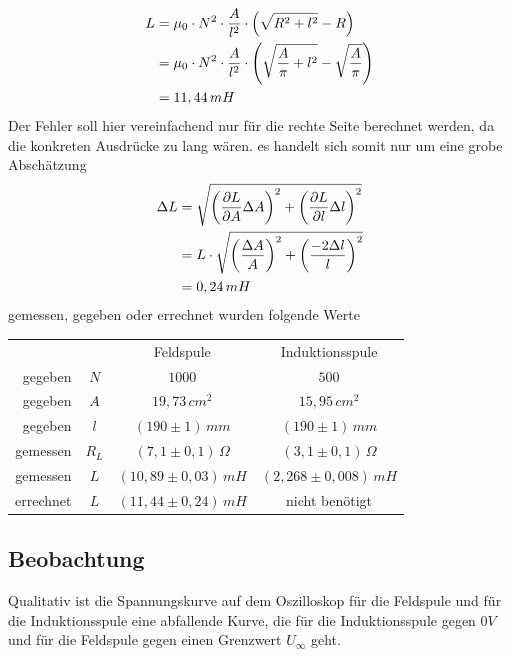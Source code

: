 \documentclass{article}
\begin{document}
\begin{align}
L &= \mu_0 \cdot N^2 \cdot \frac{A}{l^2} \cdot \left( \sqrt{R^2+l^2}-R \right)
\notag
\\
 &= \mu_0 \cdot N^2 \cdot \frac{A}{l^2} \cdot \left( \sqrt{\frac{A}{\pi}+l^2}-\sqrt{\frac{A}{\pi}} \right)
\notag
\\
&= 11,44 \, mH
\end{align}
Der Fehler soll hier vereinfachend nur für die rechte Seite berechnet werden, da die konkreten Ausdrücke zu lang wären. es handelt sich somit nur um eine grobe Abschätzung 
\begin{align}
\Delta L &= \sqrt{
	\left(\frac{\partial L}{\partial A} \Delta A \right)^2 +
	\left(\frac{\partial L}{\partial l} \Delta l \right)^2 }
\notag
\\
&= L \cdot \sqrt{
	\left(\frac{\Delta A}{A} \right)^2 +
	\left(\frac{-2 \Delta l }{ l}  \right)^2 }
\notag
\\
&= 0,24 \, mH
\notag
\end{align}
gemessen, gegeben oder errechnet wurden folgende Werte

\begin{center}
\begin{tabular}{r c c c}
 & & Feldspule & Induktionsspule \\
gegeben & \(N\) & \(1000\) & \(500\) \\
gegeben & \(A\) & \(19,73\,cm^2\) & \(15,95\,cm^2\) \\
gegeben & \(l\) & \((190 \pm 1)\, mm\) & \((190 \pm 1)\, mm\) \\
gemessen & \(R_L\) & \((7,1 \pm 0,1)\, \Omega \) & \((3,1 \pm 0,1)\, \Omega \) \\
gemessen & \(L\) & \((10,89 \pm 0,03)\, mH \) & \((2,268 \pm 0,008)\, mH \) \\
errechnet & \(L\) & \((11,44 \pm 0,24)\, mH \) & nicht  benötigt \\

\end{tabular}
\end{center}

\subsection{Beobachtung}

Qualitativ ist die Spannungskurve auf dem Oszilloskop für die Feldspule und für die Induktionsspule eine abfallende Kurve, die für die Induktionsspule gegen \(0V\) und für die Feldspule gegen einen Grenzwert \( U_\infty \) geht. 
\end{document}
